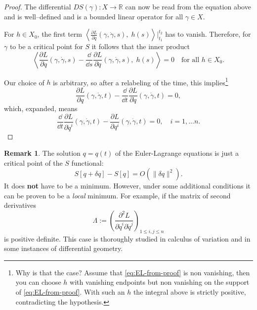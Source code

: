 \documentclass[english,fontsize=11pt,paper=b5]{scrbook}
\theoremstyle{definition}
\newtheorem{remark}{Remark}[chapter]
\begin{document}
\begin{proof}
      The differential $DS(\gamma): X \to \mathbb{R}$ can now be read from the equation above and is well--defined and is a bounded linear operator for all $\gamma\in X$.

      For $h\in X_0$, the first term $\left\langle\frac{\partial L}{\partial \dot q}(\gamma, \dot \gamma, s),\; h(s)\right\rangle\Big|_{t_1}^{t_2}$ has to vanish. Therefore, for $\gamma$ to be a critical point for $S$ it follows that the inner product
      \begin{equation}
        \left\langle
          \frac{\partial L}{\partial q}(\gamma, \dot \gamma, s)
          - \frac{\dd}{\dd s}\frac{\partial L}{\partial \dot q}(\gamma, \dot \gamma, s)
        ,\; h(s)\right\rangle = 0 \quad\mbox{for all } h\in X_0.
      \end{equation}

      Our choice of $h$ is arbitrary, so after a relabeling of the time, this implies\footnote{%
        Why is that the case? Assume that \eqref{eq:EL-from-proof} is non vanishing, then you can choose %
        $h$ with vanishing endpoints but non vanishing on the support of \eqref{eq:EL-from-proof}. %
      With such an $h$ the integral above is strictly positive, contradicting the hypothesis.}
      \begin{equation}\label{eq:EL-from-proof}
        \frac{\partial L}{\partial q}(\gamma, \dot \gamma, t)
        - \frac{\dd}{\dd t}\frac{\partial L}{\partial \dot q}(\gamma, \dot \gamma, t) = 0,
      \end{equation}
      which, expanded, means
      \begin{equation}
        \frac{\dd}{\dd t}\frac{\partial L}{\partial \dot q^i}(\gamma, \dot \gamma, t) - \frac{\partial L}{\partial q^i}(\gamma, \dot \gamma, t) = 0, \quad i=1,\ldots n.
      \end{equation}
    \end{proof}

    \begin{remark}
      The solution $q=q(t)$ of the Euler-Lagrange equations is just a critical point of the $S$ functional:
      \begin{equation}
        S[q + \delta q] - S[q] = O(\|\delta q\|^2).
      \end{equation}
      It does \textbf{not} have to be a minimum. However, under some additional conditions it can be proven to be a \emph{local} minimum.
      For example, if the matrix of second derivatives
      \begin{equation}\label{eq:hsd}
        \Lambda := \left(
          \frac{\partial^2 L}{\partial\dot q^i \partial\dot q^j}
        \right)_{1\leq i,j\leq n}
      \end{equation}
      is positive definite.
      This case is thoroughly studied in calculus of variation and in some instances of differential geometry.
    \end{remark}
\end{document}
